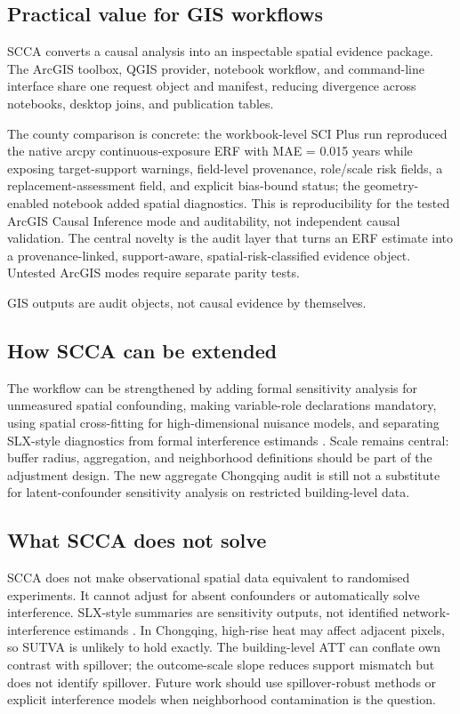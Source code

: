 \documentclass{article}
\begin{document}
\subsection{Practical value for GIS workflows}

SCCA converts a causal analysis into an inspectable spatial evidence package. The ArcGIS toolbox, QGIS provider, notebook workflow, and command-line interface share one request object and manifest, reducing divergence across notebooks, desktop joins, and publication tables.

The county comparison is concrete: the workbook-level SCI Plus run reproduced the native arcpy continuous-exposure ERF with MAE = 0.015 years while exposing target-support warnings, field-level provenance, role/scale risk fields, a replacement-assessment field, and explicit bias-bound status; the geometry-enabled notebook added spatial diagnostics. This is reproducibility for the tested ArcGIS Causal Inference mode and auditability, not independent causal validation. The central novelty is the audit layer that turns an ERF estimate into a provenance-linked, support-aware, spatial-risk-classified evidence object. Untested ArcGIS modes require separate parity tests.

GIS outputs are audit objects, not causal evidence by themselves.

\subsection{How SCCA can be extended}

The workflow can be strengthened by adding formal sensitivity analysis for unmeasured spatial confounding, making variable-role declarations mandatory, using spatial cross-fitting for high-dimensional nuisance models, and separating SLX-style diagnostics from formal interference estimands \citep{chernozhukov2018dml,forastiere2021interference,papadogeorgou2022causal}. Scale remains central: buffer radius, aggregation, and neighborhood definitions should be part of the adjustment design. The new aggregate Chongqing audit is still not a substitute for latent-confounder sensitivity analysis on restricted building-level data.

\subsection{What SCCA does not solve}

SCCA does not make observational spatial data equivalent to randomised experiments. It cannot adjust for absent confounders or automatically solve interference. SLX-style summaries are sensitivity outputs, not identified network-interference estimands \citep{forastiere2021interference,papadogeorgou2022causal}. In Chongqing, high-rise heat may affect adjacent pixels, so SUTVA is unlikely to hold exactly. The building-level ATT can conflate own contrast with spillover; the outcome-scale slope reduces support mismatch but does not identify spillover. Future work should use spillover-robust methods \citep{aronow2017interference} or explicit interference models when neighborhood contamination is the question.
\end{document}
